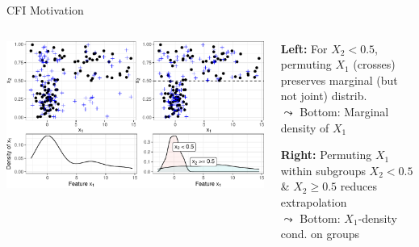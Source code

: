 \documentclass[10pt,compress,t,notes=noshow, xcolor=table]{beamer}
\begin{document}
\begin{frame}{CFI Motivation}
{\begin{columns}[T, totalwidth = \textwidth]
\begin{column}{0.43\textwidth}
\includegraphics[width=\linewidth]{figure_man/conditional_sampling.pdf}
\centerline{}
\end{column}
\begin{column}{0.56\textwidth}
    \textbf{Left:} For $X_2<0.5$, permuting $X_1$ (crosses) preserves marginal (but not joint) distrib. \\
    $\leadsto$ Bottom: Marginal density of $X_1$
    
    \medskip 
    
    \textbf{Right:} Permuting $X_1$ within subgroups $X_2<0.5$ \& $X_2\geq 0.5$ reduces extrapolation\\
    $\leadsto$ Bottom: $X_1$-density cond. on groups
\end{column}
\end{columns}
}
\end{frame}
\end{document}
